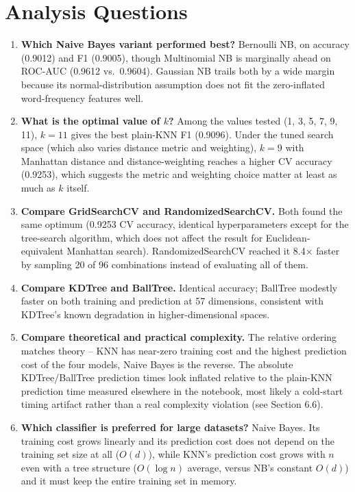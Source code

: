 \documentclass[11pt,a4paper]{article}
\begin{document}
\section{Analysis Questions}
\begin{enumerate}[nosep]
  \item \textbf{Which Naive Bayes variant performed best?} Bernoulli NB, on accuracy (0.9012) and F1 (0.9005), though Multinomial NB is marginally ahead on ROC-AUC (0.9612 vs.\ 0.9604). Gaussian NB trails both by a wide margin because its normal-distribution assumption does not fit the zero-inflated word-frequency features well.
  \item \textbf{What is the optimal value of $k$?} Among the values tested (1, 3, 5, 7, 9, 11), $k{=}11$ gives the best plain-KNN F1 (0.9096). Under the tuned search space (which also varies distance metric and weighting), $k{=}9$ with Manhattan distance and distance-weighting reaches a higher CV accuracy (0.9253), which suggests the metric and weighting choice matter at least as much as $k$ itself.
  \item \textbf{Compare GridSearchCV and RandomizedSearchCV.} Both found the same optimum (0.9253 CV accuracy, identical hyperparameters except for the tree-search algorithm, which does not affect the result for Euclidean-equivalent Manhattan search). RandomizedSearchCV reached it 8.4$\times$ faster by sampling 20 of 96 combinations instead of evaluating all of them.
  \item \textbf{Compare KDTree and BallTree.} Identical accuracy; BallTree modestly faster on both training and prediction at 57 dimensions, consistent with KDTree's known degradation in higher-dimensional spaces.
  \item \textbf{Compare theoretical and practical complexity.} The relative ordering matches theory -- KNN has near-zero training cost and the highest prediction cost of the four models, Naive Bayes is the reverse. The absolute KDTree/BallTree prediction times look inflated relative to the plain-KNN prediction time measured elsewhere in the notebook, most likely a cold-start timing artifact rather than a real complexity violation (see Section 6.6).
  \item \textbf{Which classifier is preferred for large datasets?} Naive Bayes. Its training cost grows linearly and its prediction cost does not depend on the training set size at all ($O(d)$), while KNN's prediction cost grows with $n$ even with a tree structure ($O(\log n)$ average, versus NB's constant $O(d)$) and it must keep the entire training set in memory.
\end{enumerate}
\end{document}

